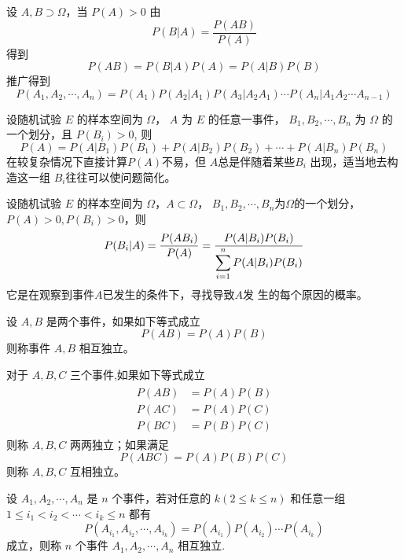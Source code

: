  设 $A,B \supset \Omega$，当 $P(A) > 0$ 由
\begin{equation*}
    P(B|A) = \frac{P(AB)}{P(A)}
\end{equation*} 得到 \begin{equation}
    P(AB) = P(B|A)P(A) = P(A|B)P(B)
\end{equation} 推广得到
\begin{equation}
    P(A_1,A_2, \cdots ,A_n) = P(A_1)P(A_2|A_1)P(A_3|A_2A_1) \cdots
    P(A_{n}|A_1A_2\cdots A_{n-1})
\end{equation}

 设随机试验 $E$ 的样本空间为 $\Omega$， $A$ 为 $E$ 的任意一事件，
$B_1,B_2,\cdots,B_n$ 为 $\Omega$ 的一个划分，且 $P(B_i) > 0$, 则
\begin{equation}
    P(A) = P(A|B_1)P(B_1) + P(A|B_2)P(B_2) + \cdots + P(A|B_n)P(B_n)
\end{equation}
在较复杂情况下直接计算$P(A)$不易，但 $A$总是伴随着某些$B_i$ 出现，适当地去构造这一组 $B_i$往往可以使问题简化。

 设随机试验 $E$ 的样本空间为 $\Omega$，$A \subset \Omega$，
$B_1,B_2,\cdots,B_n$为$\Omega$的一个划分，$P(A) > 0,P(B_i)>0$，则
\begin{equation}
    P(B_i|A) = \frac{P(AB_i)}{P(A)} = \displaystyle{\frac{\displaystyle{
        P(A|B_i)P(B_i)
    }}{\displaystyle{
        \sum_{i=1}^n P(A|B_i)P(B_i)
    }}}
\end{equation}
它是在观察到事件$A$已发生的条件下，寻找导致$A$发 生的每个原因的概率。

设 $A,B$ 是两个事件，如果如下等式成立 
\begin{equation}
    P(AB) = P(A)P(B)
\end{equation}
则称事件 $A,B$ 相互独立。

 对于 $A,B,C$ 三个事件,如果如下等式成立
\begin{align}
    \begin{split}
        P(AB) & = P(A)P(B) \\
        P(AC) & = P(A)P(C) \\
        P(BC) & = P(B)P(C) 
    \end{split}
\end{align}
则称 $A,B,C$ 两两独立；如果满足
\begin{equation}
    P(ABC) = P(A)P(B)P(C)
\end{equation}
则称 $A,B,C$ 互相独立。

 设 $A_1,A_2,\cdots,A_n$ 是 $n$ 个事件，若对任意的 $k(2 \leqslant k \leqslant n)$
和任意一组 $ 1 \leqslant i_1 < i_2 < \cdots < i_k \leqslant n $ 都有
\begin{equation}
    P(A_{i_1}, A_{i_2}, \cdots, A_{i_k}) = P(A_{i_1})P(A_{i_2})\cdots P(A_{i_k})
\end{equation}
成立，则称 $n$ 个事件 $A_1,A_2,\cdots,A_n$ 相互独立.


